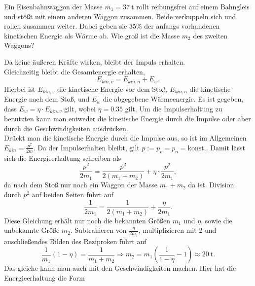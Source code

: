 	\begin{Exercise}[label=ipho201741, title = Eisenbahnwaggon,difficulty={1},origin = 4. Runde IPhO 2017]
 Ein Eisenbahnwaggon der Masse $m_1 = 37~\mathrm{t}$ rollt reibungsfrei auf einem Bahngleis und stößt mit einem anderen Waggon zusammen. Beide verkuppeln sich und rollen zusammen weiter. Dabei geben sie 35\% der anfangs vorhandenen kinetischen Energie als Wärme ab. Wie groß ist die Masse $m_2$ des zweiten Waggons?
	\end{Exercise}
\begin{Answer}[ref = ipho201741]
	Da keine äußeren Kräfte wirken, bleibt der Impuls erhalten.\\ Gleichzeitig bleibt die Gesamtenergie erhalten,
	\begin{equation}\label{energycons}
		E_{kin,v} = E_{kin,n}+E_{w}.
	\end{equation}
	Hierbei ist $E_{kin,v}$ die kinetische Energie vor dem Stoß, $E_{kin,n}$ die kinetische Energie nach dem Stoß, und $E_{w}$ die abgegebene Wärmeenergie. Es ist gegeben, dass $E_{w} = \eta \cdot E_{kin,v}$ gilt, wobei $\eta = 0.35$ gilt. Um die Impulserhaltung zu benutzten kann man entweder die kinetische Energie durch die Impulse oder aber durch die Geschwindigkeiten ausdrücken.\\
	Drückt man die kinetische Energie durch die Impulse aus, so ist im Allgemeinen $E_{kin} = \frac{p^2}{2m}$. Da der Impulserhalten bleibt, gilt $p:=p_v = p_n = \mathrm{konst.}$. Damit lässt sich die Energieerhaltung schreiben als
	\begin{equation}\label{penenergycons}
		\frac{p^2}{2m_1}= \frac{p^2}{2\left(m_1+m_2\right)} + \eta\cdot \frac{p^2}{2m_1},
	\end{equation}
	da nach dem Stoß nur noch ein \glqq Waggon\grqq{} der Masse $m_1+m_2$ da ist.
	Division durch $p^2$ auf beiden Seiten führt auf
	\begin{equation}\label{masscond}
		\frac{1}{2m_1}= \frac{1}{2\left(m_1+m_2\right)}+\frac{\eta}{2m_1}.
	\end{equation}
	Diese Gleichung erhält nur noch die bekannten Größen $m_1$ und $\eta$, sowie die unbekannte Größe $m_2$. Subtrahieren von $\frac{\eta}{2m_1}$, multiplizieren mit 2 und anschließendes Bilden des Reziproken führt auf
	\begin{equation*}\label{solp}
	\boxed{
		\frac{1}{m_1}\left(1-\eta\right) = \frac{1}{m_1+m_2} \Rightarrow m_2 = m_1\left(\frac{1}{1-\eta}-1\right)\approx 20~\mathrm{t}.}
	\end{equation*}
	Das gleiche kann man auch mit den Geschwindigkeiten machen. Hier hat die Energieerhaltung die Form

\end{Answer}
